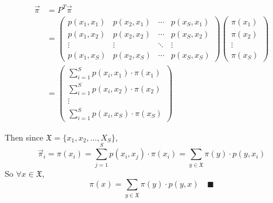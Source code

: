 \documentclass[11pt,letterpaper, leqno]{article}
\numberwithin{equation}{section}
\numberwithin{theorem}{section}
\numberwithin{lemma}{section}
\numberwithin{corollary}{section}
\numberwithin{definition}{section}
\numberwithin{proposition}{section}
\numberwithin{remark}{section}
\numberwithin{example}{section}
\newcommand{\mfX}{\mathfrak{X}}
\renewcommand{\qed}{\quad \blacksquare}
\begin{document}
\begin{enumerate}
        \color{blue}
            \begin{align*}
                \vec \pi &= P^T \vec \pi\\
                &= \begin{pmatrix}
                    p(x_1, x_1) & p(x_2, x_1) & \cdots & p(x_S, x_1) \\
                    p(x_1, x_2) & p(x_2, x_2) & \cdots & p(x_S, x_2) \\
                    \vdots & \vdots & \ddots & \vdots \\
                    p(x_1, x_S) & p(x_2, x_S) & \cdots & p(x_S, x_S)
                \end{pmatrix} \begin{pmatrix}
                    \pi(x_1)\\
                    \pi(x_2)\\
                    \vdots\\
                    \pi(x_S)
                \end{pmatrix}\\
                &= \begin{pmatrix}
                    \sum_{i=1}^S p(x_i, x_1) \cdot \pi(x_1)\\
                    \sum_{i=1}^S p(x_i, x_2) \cdot \pi(x_2)\\
                    \vdots\\
                    \sum_{i=1}^S p(x_i, x_S) \cdot \pi(x_S)
                \end{pmatrix}
            \end{align*}

            Then since $\mfX = \{x_1, x_2, \dots, X_S\}$, 
            \[\vec \pi_i = \pi(x_i) = \sum_{j=1}^S p(x_i, x_j) \cdot \pi(x_i) = \sum_{y \in \mfX} \pi(y) \cdot p(y, x_i)\]
            So $\forall x \in \mfX$, 
            \[\pi(x) = \sum_{y \in \mfX} \pi(y) \cdot p(y, x) \qed\]
        \color{black}
\end{enumerate}
\end{document}
